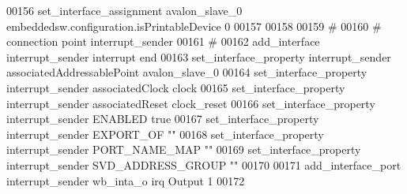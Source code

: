 \begin{DoxyCode}
00156 \textcolor{comment}{}set\_interface\_assignment avalon\_slave\_0 embeddedsw.configuration.isPrintableDevice 0\textcolor{comment}{}
00157 \textcolor{comment}{}
00158 
00159 \textcolor{comment}{# }
00160 \textcolor{comment}{}\textcolor{comment}{# connection point interrupt\_sender}
00161 \textcolor{comment}{}\textcolor{comment}{# }
00162 \textcolor{comment}{}add\_interface interrupt\_sender interrupt end\textcolor{comment}{}
00163 \textcolor{comment}{}set\_interface\_property interrupt\_sender associatedAddressablePoint avalon\_slave\_0\textcolor{comment}{}
00164 \textcolor{comment}{}set\_interface\_property interrupt\_sender associatedClock clock\textcolor{comment}{}
00165 \textcolor{comment}{}set\_interface\_property interrupt\_sender associatedReset clock\_reset\textcolor{comment}{}
00166 \textcolor{comment}{}set\_interface\_property interrupt\_sender ENABLED true\textcolor{comment}{}
00167 \textcolor{comment}{}set\_interface\_property interrupt\_sender EXPORT\_OF ""\textcolor{comment}{}
00168 \textcolor{comment}{}set\_interface\_property interrupt\_sender PORT\_NAME\_MAP ""\textcolor{comment}{}
00169 \textcolor{comment}{}set\_interface\_property interrupt\_sender SVD\_ADDRESS\_GROUP ""\textcolor{comment}{}
00170 \textcolor{comment}{}
00171 add\_interface\_port interrupt\_sender wb\_inta\_o irq Output 1\textcolor{comment}{}
00172 \textcolor{comment}{}
\end{DoxyCode}
